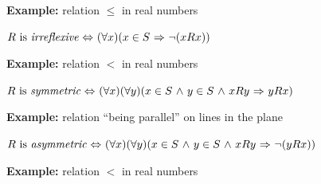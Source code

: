\documentclass[11pt,paper=b5,footinclude,headinclude]{scrbook} %
\def\inn {{~\wedge~}}
\def\sledi {{~\Rightarrow~}}
\def\cee {{~\Leftrightarrow~}}
\theoremstyle{remark}
\theoremstyle{definition} %
\theoremstyle{theorem} %
\begin{document}
\textbf{ Example:} relation $\le$ in real numbers

\bigskip

$R \textrm{ is {\em irreflexive}} \cee (\forall x)(x\in S\sledi \neg(xRx))$


\textbf{ Example:} relation  $<$ in real numbers

\bigskip

$R \textrm{ is {\em symmetric}} \cee (\forall x)(\forall y)(x\in S\inn y\in S\inn xRy\sledi yRx)$

%

\textbf{ Example:} relation ``being parallel'' on lines in the plane

\bigskip

$R \textrm{ is {\em asymmetric}} \cee (\forall x)(\forall y)(x\in S\inn y\in S\inn xRy\sledi \neg(yRx))$


\textbf{ Example:} relation  $<$ in real numbers

\end{document}
